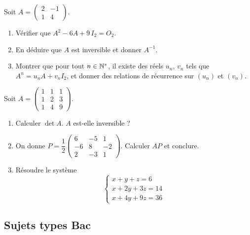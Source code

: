 Soit $A = \begin{pmatrix}2&-1\\1&4\end{pmatrix}$.
\begin{enumerate}
	\item Vérifier que $A^2 - 6A + 9\,I_2 = O_2$.
	\item En déduire que $A$ est inversible et donner $A^{-1}$.
	\item Montrer que pour tout $n \in \mathbb{N}^*$, il existe des réels $u_n$, $v_n$
	tels que $A^n = u_n A + v_n I_2$, et donner des relations de récurrence
	sur $(u_n)$ et $(v_n)$.
\end{enumerate}

Soit $A = \begin{pmatrix}1&1&1\\1&2&3\\1&4&9\end{pmatrix}$.
\begin{enumerate}
	\item Calculer $\det A$. $A$ est-elle inversible ?
	\item On donne $P = \dfrac{1}{2}\begin{pmatrix}6&-5&1\\-6&8&-2\\2&-3&1\end{pmatrix}$.
	Calculer $AP$ et conclure.
	\item Résoudre le système
	$$
	\begin{cases}
		x + y + z = 6 \\
		x + 2y + 3z = 14 \\
		x + 4y + 9z = 36
	\end{cases}
	$$
\end{enumerate}

\subsection{Sujets types Bac}

